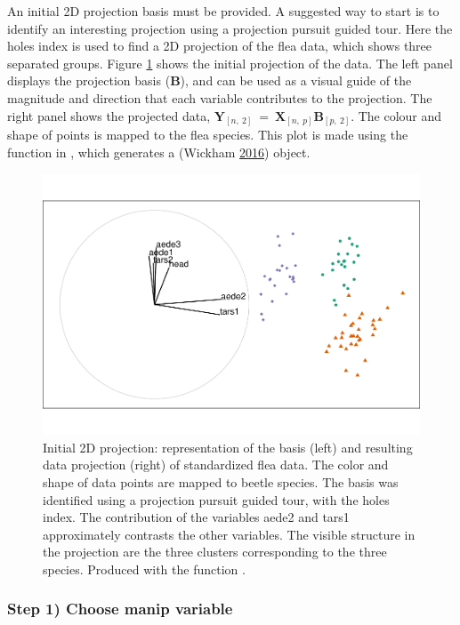 An initial 2D projection basis must be provided. A suggested way to
start is to identify an interesting projection using a projection
pursuit guided tour. Here the holes index is used to find a 2D
projection of the flea data, which shows three separated groups. Figure
\ref{fig:step0} shows the initial projection of the data. The left panel
displays the projection basis (\(\textbf{B}\)), and can be used as a
visual guide of the magnitude and direction that each variable
contributes to the projection. The right panel shows the projected data,
\(\textbf{Y}_{[n,~2]} ~=~ \textbf{X}_{[n,~p]} \textbf{B}_{[p,~2]}\). The
colour and shape of points is mapped to the flea species. This plot is
made using the  function in ,
which generates a  (Wickham
\protect\hyperlink{ref-wickham_ggplot2:_2016}{2016}) object.

\begin{Schunk}
\begin{figure}

{\centering \includegraphics[width=0.7\linewidth]{spinifex_paper_files/figure-latex/step0-1} 

}

\caption[Initial 2D projection]{Initial 2D projection: representation of the basis  (left) and resulting data projection (right) of standardized flea data. The color and shape of data points are mapped to beetle species. The basis was identified using a projection pursuit guided tour, with the holes index. The contribution of the variables aede2 and tars1 approximately contrasts the other variables. The visible structure in the projection are the three clusters corresponding to the three species. Produced with the function .}\label{fig:step0}
\end{figure}
\end{Schunk}

\hypertarget{step-1-choose-manip-variable}{%
\subsubsection{Step 1) Choose manip
variable}\label{step-1-choose-manip-variable}}

